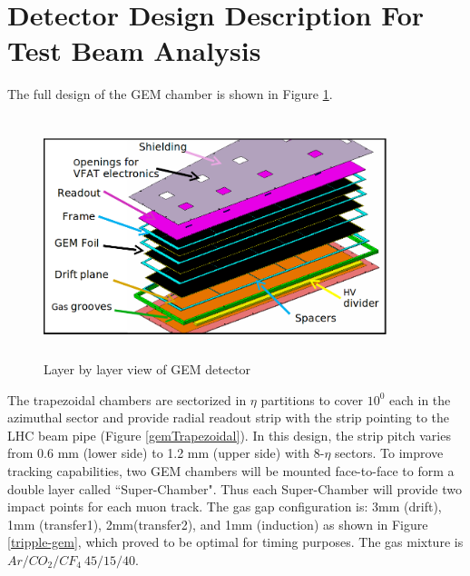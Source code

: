 \section{Detector Design Description For Test Beam Analysis}
The full design of the GEM chamber is shown in Figure \ref{ge11}.
\begin{figure}[htb]
	\begin{center}
		\includegraphics[width=10.0cm,height=7cm]{figures/GEM/ge11cad.png}
		\caption{Layer by layer view of GEM detector}
		\label{ge11}
	\end{center}
\end{figure} 
The trapezoidal chambers are sectorized in $\eta$ partitions to cover $10^0$ each in the azimuthal sector and provide radial readout strip with the strip pointing to the LHC beam pipe (Figure \ref{gemTrapezoidal}). In this design, the strip pitch varies from 0.6 mm (lower side) to 1.2 mm (upper side) with 8-$\eta$ sectors. To improve tracking capabilities, two GEM chambers will be mounted face-to-face to form a double layer called ``Super-Chamber". Thus each Super-Chamber will provide two impact points for each muon track. The gas gap configuration is: 3mm (drift), 1mm (transfer1), 2mm(transfer2), and 1mm (induction) as shown in Figure \ref{tripple-gem}, which proved to be optimal for timing purposes. The gas mixture is $Ar/CO_2/CF_4~45/15/40$.
